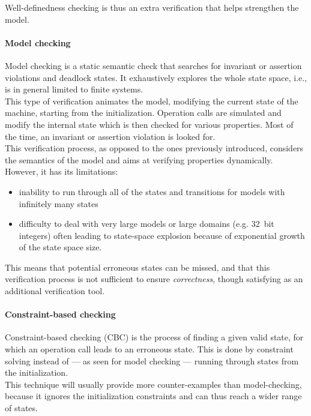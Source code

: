 Well-definedness checking is thus an extra verification that helps strengthen the model.

\paragraph{Model checking}

Model checking is a static semantic check that searches for invariant or
assertion violations and deadlock states. It exhaustively explores the whole
state space, i.e., is in general limited to finite systems.\\
This type of verification animates the model, modifying the current state of the
machine, starting from the initialization. Operation calls are simulated and
modify the internal state which is then checked for various properties. Most of
the time, an invariant or assertion violation is looked for.\\
This verification process, as opposed to the ones previously introduced,
considers the semantics of the model and aims at verifying properties
dynamically. However, it has its limitations:
\begin{itemize}
\item inability to run through all of the states and transitions for models with
  infinitely many states
\item difficulty to deal with very large models or large domains (e.g. 32~bit
  integers) often leading to state-space explosion because of exponential growth
  of the state space size.
\end{itemize}
This means that potential erroneous states can be missed, and that this
verification process is not sufficient to ensure \textit{correctness}, though
satisfying as an additional verification tool.

\paragraph{Constraint-based checking}

Constraint-based checking (CBC) is the process of finding a given valid state, for which an operation call leads to an erroneous state. This is done by constraint solving instead of --- as seen for model checking --- running through states from the initialization.\\
This technique will usually provide more counter-examples than model-checking, because it ignores the initialization constraints and can thus reach a wider range of states.

